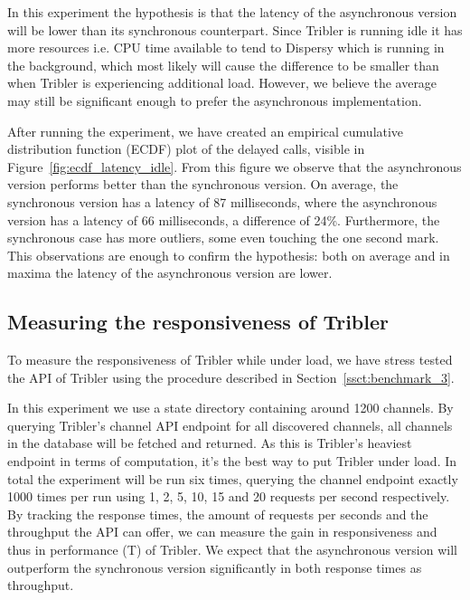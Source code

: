 In this experiment the hypothesis is that the latency of the asynchronous version will be lower than its synchronous counterpart.
Since Tribler is running idle it has more resources i.e. CPU time available to tend to Dispersy which is running in the background, which most likely will cause the difference to be smaller than when Tribler is experiencing additional load.
However, we believe the average may still be significant enough to prefer the asynchronous implementation.

After running the experiment, we have created an empirical cumulative distribution function (ECDF) plot of the delayed calls, visible in Figure~\ref{fig:ecdf_latency_idle}.
From this figure we observe that the asynchronous version performs better than the synchronous version.
On average, the synchronous version has a latency of 87 milliseconds, where the asynchronous version has a latency of 66 milliseconds, a difference of 24\%.
Furthermore, the synchronous case has more outliers, some even touching the one second mark.
This observations are enough to confirm the hypothesis: both on average and in maxima the latency of the asynchronous version are lower.

\subsection{Measuring the responsiveness of Tribler}

To measure the responsiveness of Tribler while under load, we have stress tested the API of Tribler using the procedure described in Section~\ref{ssct:benchmark_3}.

In this experiment we use a state directory containing around 1200 channels.
By querying Tribler's channel API endpoint for all discovered channels, all channels in the database will be fetched and returned.
As this is Tribler's heaviest endpoint in terms of computation, it's the best way to put Tribler under load.
In total the experiment will be run six times, querying the channel endpoint exactly 1000 times per run using 1, 2, 5, 10, 15 and 20 requests per second respectively.
By tracking the response times, the amount of requests per seconds and the throughput the API can offer, we can measure the gain in responsiveness and thus in performance (T) of Tribler.
We expect that the asynchronous version will outperform the synchronous version significantly in both response times as throughput.

